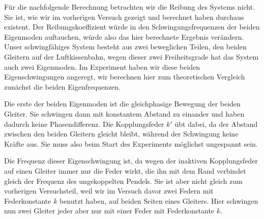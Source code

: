 \documentclass{article}
\begin{document}
                  Für die nachfolgende Berechnung betrachten wir die Reibung des Systems nicht.
                  Sie ist, wie wir im vorherigen Versuch gezeigt und berechnet haben durchaus existent.
                  Der Reibungskoeffizient würde in den Schwingungsfrequenzen der beiden Eigenmoden auftauchen, würde also das hier berechnete Ergebnis verändern.
                  Unser schwingfähiges System besteht aus zwei beweglichen Teilen, den beiden Gleitern auf der Luftkissenbahn,
                  wegen dieser zwei Freiheitsgrade hat das System auch zwei Eigenmoden.
                  Im Experiment haben wir diese beiden Eigenschwingungen angeregt, wir berechnen hier zum theoretischen Vergleich zunächst die beiden Eigenfrequenzen.

                  Die erste der beiden Eigenmoden ist die gleichphasige Bewegung der beiden Gleiter.
                  Sie schwingen dann mit konstantem Abstand zu einander und haben dadurch keine Phasendifferenz.
                  Die Kopplungsfeder \(k'\) übt dabei, da der Abstand zwischen den beiden Gleitern gleicht bleibt, während der Schwingung keine Kräfte aus.
                  Sie muss also beim Start des Experiments möglichst ungespannt sein.

                  Die Frequenz dieser Eigenschwingung ist, da wegen der inaktiven Kopplungsfeder auf einen Gleiter immer nur die Feder wirkt, die ihn mit dem Rand verbindet gleich der Frequenz des ungekoppelten Pendels.
                  Sie ist aber nicht gleich zum vorherigen Versuchsteil, weil wir im Versuch davor zwei Federn mit Federkonstante \(k\) benutzt haben, auf beiden Seiten eines Gleiters.
                  Hier schwingen nun zwei Gleiter jeder aber nur mit einer Feder mit Federkonstante \(k\).
\end{document}
